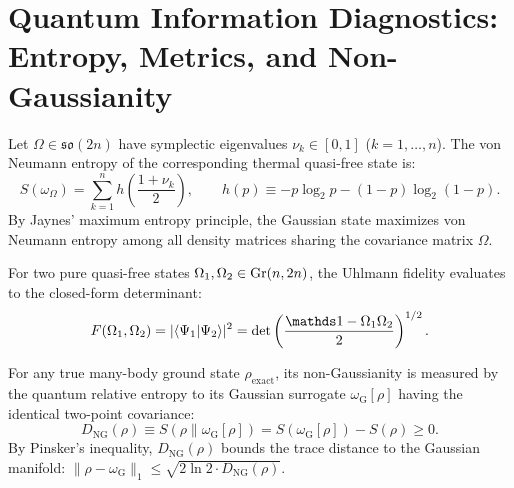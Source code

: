\section{Quantum Information Diagnostics: Entropy, Metrics, and Non-Gaussianity}
\label{sec:m1_1b_quantum_information}

\begin{definition}
\label{def:m1_1b_gaussian_entropy}
Let $\Omega \in \mathfrak{so}(2n)$ have symplectic eigenvalues $\nu_k \in [0, 1]$ ($k = 1, \dots, n$). The von Neumann entropy of the corresponding thermal quasi-free state is:
\begin{equation}
\label{eq:m1_1b_von_neumann_entropy}
S(\omega_\Omega) = \sum_{k=1}^n h\left(\frac{1 + \nu_k}{2}\right), \qquad h(p) \equiv -p \log_2 p - (1-p) \log_2(1-p).
\end{equation}
By Jaynes' maximum entropy principle, the Gaussian state maximizes von Neumann entropy among all density matrices sharing the covariance matrix $\Omega$.
\end{definition}

\begin{definition}
\label{def:m1_1b_fidelity}
For two pure quasi-free states $\Omega_1, \Omega_2 \in \operatorname{Gr}(n, 2n)$, the Uhlmann fidelity evaluates to the closed-form determinant:
\begin{equation}
\label{eq:m1_1b_uhlmann_fidelity}
F(\Omega_1, \Omega_2) = |\langle \Psi_1 | \Psi_2 \rangle|^2 = \det\left(\frac{\Id - \Omega_1 \Omega_2}{2}\right)^{1/2}.
\end{equation}
\end{definition}

\begin{definition}
\label{def:m1_1b_non_gaussianity}
For any true many-body ground state $\rho_{\mathrm{exact}}$, its non-Gaussianity is measured by the quantum relative entropy to its Gaussian surrogate $\omega_{\mathrm{G}}[\rho]$ having the identical two-point covariance:
\begin{equation}
\label{eq:m1_1b_relative_entropy}
D_{\mathrm{NG}}(\rho) \equiv S(\rho \| \omega_{\mathrm{G}}[\rho]) = S(\omega_{\mathrm{G}}[\rho]) - S(\rho) \ge 0.
\end{equation}
By Pinsker's inequality, $D_{\mathrm{NG}}(\rho)$ bounds the trace distance to the Gaussian manifold: $\|\rho - \omega_{\mathrm{G}}\|_1 \le \sqrt{2 \ln 2 \cdot D_{\mathrm{NG}}(\rho)}$.
\end{definition}


